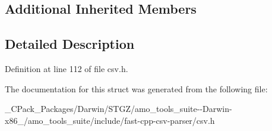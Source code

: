 \subsection*{Additional Inherited Members}


\subsection{Detailed Description}


Definition at line 112 of file csv.\+h.



The documentation for this struct was generated from the following file\+:\begin{DoxyCompactItemize}
\item 
\+\_\+\+C\+Pack\+\_\+\+Packages/\+Darwin/\+S\+T\+G\+Z/amo\+\_\+tools\+\_\+suite-\/-\/\+Darwin-\/x86\+\_/amo\+\_\+tools\+\_\+suite/include/fast-\/cpp-\/csv-\/parser/csv.\+h\end{DoxyCompactItemize}

